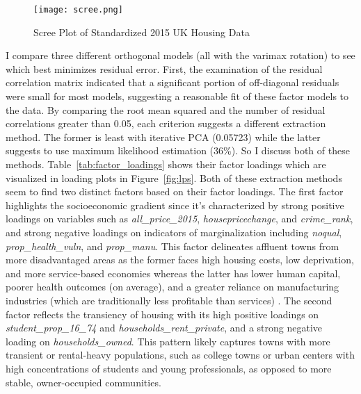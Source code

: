 \documentclass[12pt]{article}
\begin{document}
\begin{figure}
    \centering
    \texttt{[image: scree.png]}
    \caption{Scree Plot of Standardized 2015 UK Housing Data}
    \label{fig:scree}
\end{figure}

I compare three different orthogonal models (all with the varimax rotation) to see which best minimizes residual error. First, the examination of the residual correlation matrix indicated that a significant portion of off-diagonal residuals were small for most models, suggesting a reasonable fit of these factor models to the data. By comparing the root mean squared and the number of residual correlations greater than 0.05, each criterion suggests a different extraction method. The former is least with iterative PCA (0.05723) while the latter suggests to use maximum likelihood estimation (36\%). So I discuss both of these methods. Table~\ref{tab:factor_loadings} shows their factor loadings which are visualized in loading plots in Figure~\ref{fig:lps}. Both of these extraction methods seem to find two distinct factors based on their factor loadings. The first factor highlights the socioeconomic gradient since it's characterized by strong positive loadings on variables such as \textit{all\_price\_2015}, \textit{housepricechange}, and \textit{crime\_rank}, and strong negative loadings on indicators of marginalization including \textit{noqual}, \textit{prop\_health\_vuln}, and \textit{prop\_manu}. This factor delineates affluent towns from more disadvantaged areas as the former faces high housing costs, low deprivation, and more service-based economies whereas the latter has lower human capital, poorer health outcomes (on average), and a greater reliance on manufacturing industries (which are traditionally less profitable than services) \citep{Yang2020}. The second factor reflects the transiency of housing with its high positive loadings on \textit{student\_prop\_16\_74} and \textit{households\_rent\_private}, and a strong negative loading on \textit{households\_owned}. This pattern likely captures towns with more transient or rental-heavy populations, such as college towns or urban centers with high concentrations of students and young professionals, as opposed to more stable, owner-occupied communities.
\end{document}
